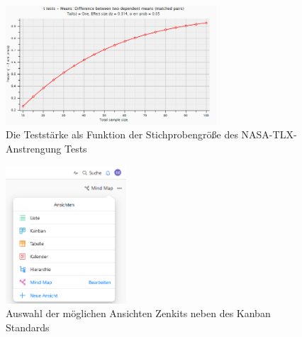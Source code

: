 \begin{figure}[h]
    \includegraphics[width=0.7\textwidth]{images/Statistiken/powertlx.PNG}
    \centering
    \caption{Die Teststärke als Funktion der Stichprobengröße des NASA-TLX-Anstrengung Tests}
    \label{fig:powertlx}
\end{figure}


\begin{figure}[h]
    \includegraphics[width=0.4\textwidth]{images/UI/zenkit_ansichten.PNG}
    \centering
    \caption{Auswahl der möglichen Ansichten Zenkits neben des Kanban Standards}
    \label{fig:views}
\end{figure}

\FloatBarrier
